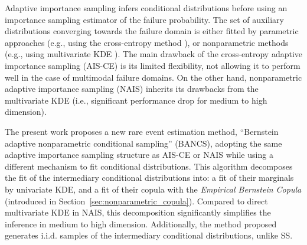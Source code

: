 Adaptive importance sampling infers conditional distributions before using an importance sampling estimator of the failure probability. 
The set of auxiliary distributions converging towards the failure domain is either fitted by parametric approaches (e.g., using the cross-entropy method \citealt{kurtz_song_2013_aisce}), or nonparametric methods (e.g., using multivariate KDE \citealt{Morio_RESS_2011}). 
The main drawback of the cross-entropy adaptive importance sampling (AIS-CE) is its limited flexibility, not allowing it to perform well in the case of multimodal failure domains. 
On the other hand, nonparametric adaptive importance sampling (NAIS) inherits its drawbacks from the multivariate KDE (i.e., significant performance drop for medium to high dimension). 


The present work proposes a new rare event estimation method, ``Bernstein adaptive nonparametric conditional sampling'' (BANCS), adopting the same adaptive importance sampling structure as AIS-CE or NAIS while using a different mechanism to fit conditional distributions. 
This algorithm decomposes the fit of the intermediary conditional distributions into: a fit of their marginals by univariate KDE, and a fit of their copula with the \emph{Empirical Bernstein Copula} (introduced in Section~\ref{sec:nonparametric_copula}). 
Compared to direct multivariate KDE in NAIS, this decomposition significantly simplifies the inference in medium to high dimension. 
Additionally, the method proposed generates i.i.d. samples of the intermediary conditional distributions, unlike SS. 

